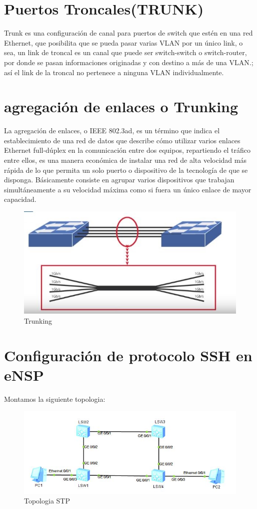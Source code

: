 \documentclass[journal]{IEEEtran}
\begin{document}
\section{\textbf{ Puertos Troncales(TRUNK)}} 
Trunk es una configuración de canal para puertos de switch que estén en una red Ethernet, que posibilita que se pueda pasar varias VLAN por un único link, o sea, un link de troncal es un canal que puede ser switch-switch o switch-router, por donde se pasan informaciones originadas y con destino a más de una VLAN.; así el link de la troncal no pertenece a ninguna VLAN individualmente.

\section{\textbf{agregación de enlaces o Trunking}}
La agregación de enlaces, o IEEE 802.3ad, es un término que indica el establecimiento de una red de datos que describe cómo utilizar varios enlaces Ethernet full-dúplex en la comunicación entre dos equipos, repartiendo el tráfico entre ellos,  es una manera económica de instalar una red de alta velocidad más rápida de lo que permita un solo puerto o dispositivo de la tecnología de que se disponga. Básicamente consiste en agrupar varios dispositivos que trabajan simultáneamente a su velocidad máxima como si fuera un único enlace de mayor capacidad.

\begin{figure}[ht]
	\centering
	\includegraphics[scale=0.5]{1.jpg}
	\caption{Trunking}
\end{figure}

\section{\textbf{Configuración de protocolo SSH en eNSP}}
Montamos la siguiente topologia:

\begin{figure}[ht]
	\centering
	\includegraphics[scale=0.5]{4.jpg}
	\caption{Topologia STP}
\end{figure}
\end{document}
